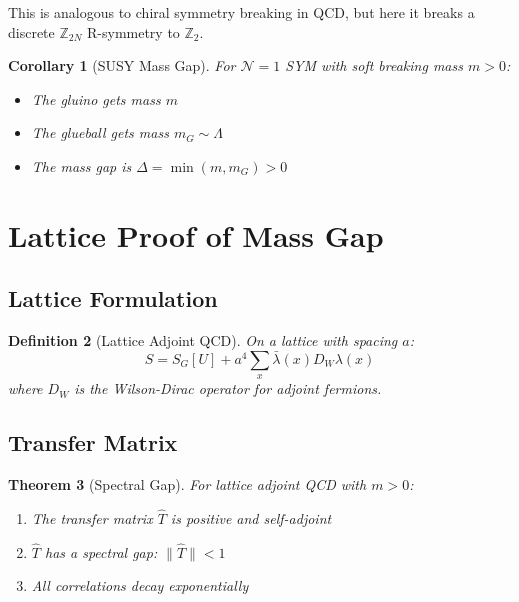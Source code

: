 \documentclass[12pt,a4paper]{article}
\newtheorem{theorem}{Theorem}[section]
\newtheorem{corollary}[theorem]{Corollary}
\newtheorem{definition}[theorem]{Definition}
\theoremstyle{remark}
\newcommand{\Z}{\mathbb{Z}}
\newcommand{\N}{\mathcal{N}}
\begin{document}
This is analogous to chiral symmetry breaking in QCD, but here it breaks a 
discrete $\Z_{2N}$ R-symmetry to $\Z_2$.

\begin{corollary}[SUSY Mass Gap]
For $\N=1$ SYM with soft breaking mass $m > 0$:
\begin{itemize}
\item The gluino gets mass $m$
\item The glueball gets mass $m_G \sim \Lambda$
\item The mass gap is $\Delta = \min(m, m_G) > 0$
\end{itemize}
\end{corollary}

\section{Lattice Proof of Mass Gap}

\subsection{Lattice Formulation}

\begin{definition}[Lattice Adjoint QCD]
On a lattice with spacing $a$:
\begin{equation}
S = S_G[U] + a^4 \sum_x \bar{\lambda}(x) D_W \lambda(x)
\end{equation}
where $D_W$ is the Wilson-Dirac operator for adjoint fermions.
\end{definition}

\subsection{Transfer Matrix}

\begin{theorem}[Spectral Gap]
\label{thm:lattice-gap}
For lattice adjoint QCD with $m > 0$:
\begin{enumerate}
\item[(i)] The transfer matrix $\hat{T}$ is positive and self-adjoint
\item[(ii)] $\hat{T}$ has a spectral gap: $\|\hat{T}\| < 1$
\item[(iii)] All correlations decay exponentially
\end{enumerate}
\end{theorem}
\end{document}
